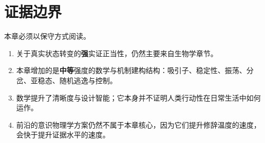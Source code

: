 \section{证据边界}

本章必须以保守方式阅读。
\begin{enumerate}[nosep]
  \item 关于真实状态转变的\textbf{强}实证正当性，仍然主要来自生物学章节。
  \item 本章增加的是\textbf{中等}强度的数学与机制建构结构：吸引子、稳定性、振荡、分岔、亚稳态、随机逃逸与控制。
  \item 数学提升了清晰度与设计智能；它本身并不证明人类行动性在日常生活中如何运作。
  \item 前沿的意识物理学方案仍然不属于本章核心，因为它们提升修辞温度的速度，会快于提升证据水平的速度。
\end{enumerate}
